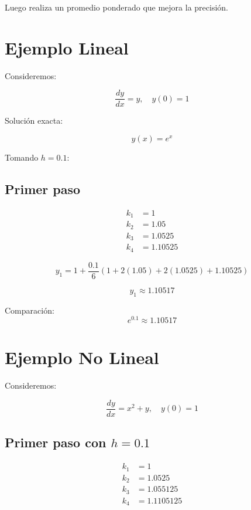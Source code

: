 \documentclass[12pt,a4paper]{article}
\begin{document}
Luego realiza un promedio ponderado que mejora la precisión.

\section{Ejemplo Lineal}

Consideremos:

\begin{equation}
\frac{dy}{dx} = y, \quad y(0)=1
\end{equation}

Solución exacta:

\begin{equation}
y(x)=e^x
\end{equation}

Tomando $h=0.1$:

\subsection*{Primer paso}

\begin{align*}
k_1 &= 1 \\
k_2 &= 1.05 \\
k_3 &= 1.0525 \\
k_4 &= 1.10525
\end{align*}

\begin{equation}
y_1 = 1 + \frac{0.1}{6}(1 + 2(1.05) + 2(1.0525) + 1.10525)
\end{equation}

\begin{equation}
y_1 \approx 1.10517
\end{equation}

Comparación:
\[
e^{0.1} \approx 1.10517
\]

\section{Ejemplo No Lineal}

Consideremos:

\begin{equation}
\frac{dy}{dx} = x^2 + y, \quad y(0)=1
\end{equation}

\subsection*{Primer paso con $h=0.1$}

\begin{align*}
k_1 &= 1 \\
k_2 &= 1.0525 \\
k_3 &= 1.055125 \\
k_4 &= 1.1105125
\end{align*}
\end{document}
